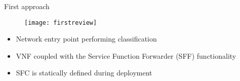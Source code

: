 \begin{frame}{First approach}

  \vspace{-0.5cm}

  \begin{figure}
    \centering
    \texttt{[image: firstreview]}
  \end{figure}

  \vspace{-0.4cm}

  \begin{itemize}
    \item Network entry point performing classification
    \item VNF coupled with the Service Function Forwarder (SFF) functionality
    \item SFC is statically defined during deployment
  \end{itemize}

\end{frame}